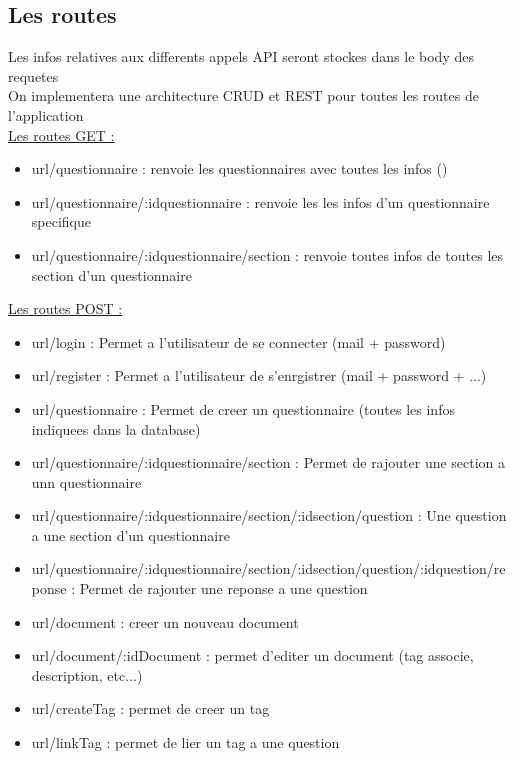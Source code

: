 \documentclass{extarticle}
\begin{document}
\subsection{Les routes}
Les infos relatives aux differents appels API seront stockes dans le body des requetes\\
On implementera une architecture CRUD et REST pour toutes les routes de l'application\\
\underline{Les routes GET :}
\begin{itemize}
    \item url/questionnaire : renvoie les questionnaires avec toutes les infos ()
    \item url/questionnaire/:idquestionnaire : renvoie les les infos d'un questionnaire specifique
    \item url/questionnaire/:idquestionnaire/section : renvoie toutes infos de toutes les section d'un questionnaire 
\end{itemize}
\underline{Les routes POST :}
\begin{itemize}
    \item url/login : Permet a l'utilisateur de se connecter (mail + password)
    \item url/register : Permet a l'utilisateur de s'enrgistrer (mail + password + ...)
    \item url/questionnaire : Permet de creer un questionnaire (toutes les infos indiquees dans la database)
    \item url/questionnaire/:idquestionnaire/section : Permet de rajouter une section a unn questionnaire
    \item url/questionnaire/:idquestionnaire/section/:idsection/question : Une question a une section d'un questionnaire
    \item url/questionnaire/:idquestionnaire/section/:idsection/question/:idquestion/reponse : Permet de rajouter une reponse a une question

    \item url/document : creer un nouveau document
    \item url/document/:idDocument : permet d'editer un document (tag associe, description, etc...)

    \item url/createTag : permet de creer un tag
    \item url/linkTag : permet de lier un tag a une question
\end{itemize}
\end{document}
